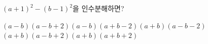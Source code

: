$(a+1)^2-(b-1)^2$을 인수분해하면?
\begin{choicesv}{$(a-b)(a-b+2)$}{$(a-b)(a+b-2)$}{$(a+b)(a-b-2)$}{$(a+b)(a-b+2)$}{$(a+b)(a+b+2)$}\end{choicesv}
